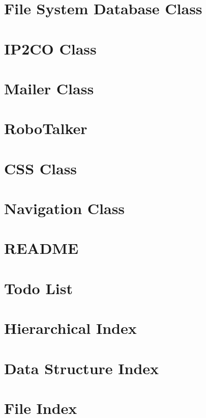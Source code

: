 \documentclass{book}
\begin{document}
\chapter{File System Database Class}
\label{fsdb}
\hypertarget{fsdb}{}

\chapter{I\-P2\-C\-O Class}
\label{ip2country}
\hypertarget{ip2country}{}

\chapter{Mailer Class}
\label{mailer1}
\hypertarget{mailer1}{}

\chapter{Robo\-Talker}
\label{robo1}
\hypertarget{robo1}{}

\chapter{C\-S\-S Class}
\label{css1}
\hypertarget{css1}{}

\chapter{Navigation Class}
\label{nav1}
\hypertarget{nav1}{}

\chapter{R\-E\-A\-D\-M\-E}
\label{md_README}
\hypertarget{md_README}{}

\chapter{Todo List}
\label{todo}
\hypertarget{todo}{}

\chapter{Hierarchical Index}

\chapter{Data Structure Index}

\chapter{File Index}

\end{document}

